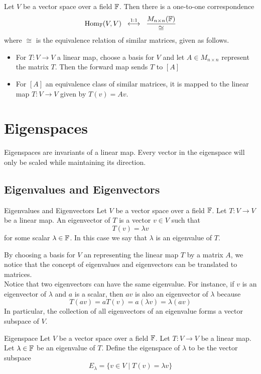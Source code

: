 \documentclass[a4paper]{article}
\begin{document}
\begin{thm}{}{} Let $V$ be a vector space over a field $\mathbb{F}$. Then there is a one-to-one correspondence $$\operatorname{Hom}_{\mathbb{F}}(V,V)\;\;\overset{1:1}{\longleftrightarrow}\;\;\frac{M_{n\times n}(\mathbb{F})}{\cong}$$ where $\cong$ is the equivalence relation of similar matrices, given as follows. 
\begin{itemize}
\item For $T:V\to V$ a linear map, choose a basis for $V$ and let $A\in M_{n\times n}$ represent the matrix $T$. Then the forward map sends $T$ to $[A]$
\item For $[A]$ an equivalence class of similar matrices, it is mapped to the linear map $T:V\to V$ given by $T(v)=Av$. 
\end{itemize}
\end{thm}

\pagebreak
\section{Eigenspaces}
Eigenspaces are invariants of a linear map. Every vector in the eigenspace will only be scaled while maintaining its direction. 

\subsection{Eigenvalues and Eigenvectors}
\begin{defn}{Eigenvalues and Eigenvectors}{} Let $V$ be a vector space over a field $\mathbb{F}$. Let $T:V\to V$ be a linear map. An eigenvector of $T$ is a vector $v\in  V$ such that $$T(v)=\lambda v$$ for some scalar $\lambda\in\mathbb{F}$. In this case we say that $\lambda$ is an eigenvalue of $T$. 
\end{defn}

By choosing a basis for $V$ an representing the linear map $T$ by a matrix $A$, we notice that the concept of eigenvalues and eigenvectors can be translated to matrices. \\

Notice that two eigenvectors can have the same eigenvalue. For instance, if $v$ is an eigenvector of $\lambda$ and $a$ is a scalar, then $av$ is also an eigenvector of $\lambda$ because $$T(av)=aT(v)=a(\lambda v)=\lambda(av)$$ In particular, the collection of all eigenvectors of an eigenvalue forms a vector subspace of $V$. 

\begin{defn}{Eigenspace}{} Let $V$ be a vector space over a field $\mathbb{F}$. Let $T:V\to V$ be a linear map. Let $\lambda\in\mathbb{F}$ be an eigenvalue of $T$. Define the eigenspace of $\lambda$ to be the vector subspace $$E_\lambda=\{v\in V\;|\;T(v)=\lambda v\}$$
\end{defn}
\end{document}
